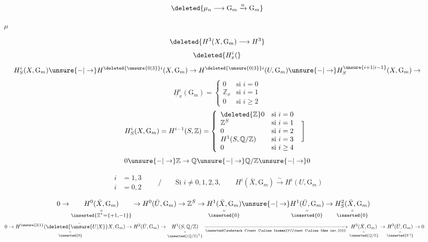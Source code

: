\[
\deleted{\mu_n\longrightarrow\mathrm{G}_m\xrightarrow{n}\mathrm{G}_m}
\]

$\mu$

\[
\deleted{H^3(X,\mathrm{G}_m)\longrightarrow H^3}
\]
\[
\deleted{H_x^i(}
\]
\[
H^i_S(X,\mathrm{G}_m)\unsure{-|\to}H^{\deleted{\unsure{0|3}}i}(X,\mathrm{G}_m)\to H^{\deleted{\unsure{0|3}}i}(U,\mathrm{G}_m)\unsure{-|\to}H^{\unsure{i+1|i-1}}_S(X,\mathrm{G}_m)\to
\]
\[
\underline{H}^i_x(\mathrm{G}_m)=
\begin{cases}
0&\text{si }i=0\\
\mathbb{Z}_x&\text{si }i=1\\
0&\text{si }i\geq2
\end{cases}
\]
\[
H^i_S(X,\mathrm{G}_m)=H^{i-1}(S,\mathbb{Z})=
\left\{\begin{array}{lll}
\deleted{\mathbb{Z}}0&\text{si }i=0\\
\mathbb{Z}^S&\text{si }i=1\\
0&\text{si }i=2&\smash{\left.\rule[-2.3ex]{0pt}{6.5ex}\right]}\\
H^1(S,\mathbb{Q}/\mathbb{Z})&\text{si }i=3\\
0&\text{si }i\geq4
\end{array}\right.

\]
\[
0\unsure{-|\to}\mathbb{Z}\to\mathbb{Q}\unsure{-|\to}\mathbb{Q}/\mathbb{Z}\unsure{-|\to}0
\]

\[
\begin{aligned} i&=1,3\\i&=0,2\end{aligned}
\qquad\big/\qquad \text{Si }i\ne0,1,2,3,\qquad H^i(\bar{X},\mathrm{G}_m)\xrightarrow{\sim}H^i(U,\mathrm{G}_m)
\]

\[
\begin{aligned}
0&\to\underset{\substack{\shortparallel\\\inserted{\mathbb{Z}^*=\{+1,-1\}}}}{H^0(\bar{X},\mathrm{G}_m)}
\to H^0(\bar{U},\mathrm{G}_m)\to\mathbb{Z}^S\to
\underset{\substack{\shortparallel\\\inserted{0}}}{H^1(\bar{X},\mathrm{G}_m)}
\unsure{-|\to}\underset{\substack{\shortparallel\\\inserted{0}}}{H^1(\bar{U},\mathrm{G}_m)}
\to\underset{\substack{\shortparallel\\\inserted{0}}}{H^2_S(\bar{X},\mathrm{G}_m)}
\end{aligned}
\]
\[
\begin{aligned}
0&\to\underset{\substack{\shortparallel\\\inserted{0}}}{H^{\unsure{2|1}}(\bar{\deleted{\unsure{U|X}}X},\mathrm{G}_m)}
\to H^2(\bar{U},\mathrm{G}_m)\to\underset{\substack{\shortparallel\\\inserted{(\mathbb{Q}/\mathbb{Z})^S}}}{H^1(S,\mathbb{Q}/\mathbb{Z})}
\xrightarrow[\inserted{\substack{\text{\uline{somme}}\\\text{\uline{des inv.}}}}]{}
\underset{\substack{\shortparallel\\\inserted{\mathbb{Q}/\mathbb{Z}}}}{H^3(\bar{X},\mathrm{G}_m)}
\to\underset{\substack{\shortparallel\\\inserted{0\,?}}}{H^3(\bar{U},\mathrm{G}_m)}\to0
\end{aligned}
\]

